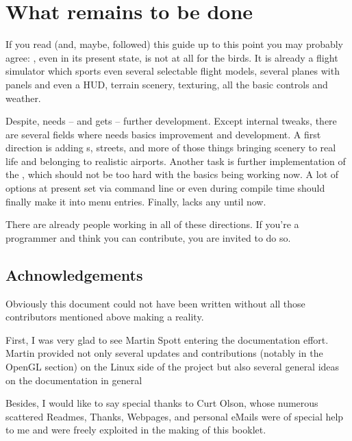 \section{What remains to be done}

If you read (and, maybe, followed) this guide up to this point you may probably agree: \FlightGear{}$\!$, even in its present state, is not at all for the birds. It is
already a flight simulator which sports even several selectable flight models, several planes with panels and even a HUD, terrain scenery, texturing, all the basic controls and weather.

Despite, \FlightGear{} needs -- and gets -- further development. Except internal tweaks,
there are several fields where \FlightGear{} needs basics improvement and development. A
first direction is adding s, streets, and more of those things bringing
scenery to real life and belonging to realistic airports. Another task is further
implementation of the , which should not be too hard with the basics
being working now. A lot of options at present set via command line or even during
compile time should finally make it into menu entries. Finally, \FlightGear{} lacks any
 until now. 

There are already people working in all of these directions. If you're a programmer and
think you can contribute, you are invited to do so.

\subsection*{Achnowledgements}
Obviously this document could not have been written without all those contributors
mentioned above making \FlightGear{} a reality.

First, I was very glad to see Martin Spott  entering the documentation effort. Martin provided not only several updates and contributions (notably in the OpenGL section) on the Linux side of the project but also several general ideas on the documentation in general

Besides, I would like to say special thanks to Curt Olson, whose
numerous scattered Readmes, Thanks, Webpages, and personal eMails were of special help to
me and were freely exploited in the making of this booklet.

